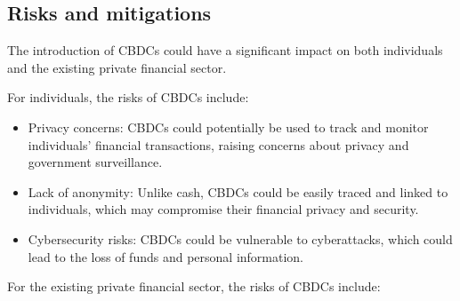 \subsection{Risks and mitigations}
The introduction of CBDCs could have a significant impact on both individuals and the existing private financial sector.\par
For individuals, the risks of CBDCs include:
\begin{itemize}
\item Privacy concerns: CBDCs could potentially be used to track and monitor individuals' financial transactions, raising concerns about privacy and government surveillance.
\item Lack of anonymity: Unlike cash, CBDCs could be easily traced and linked to individuals, which may compromise their financial privacy and security.
\item Cybersecurity risks: CBDCs could be vulnerable to cyberattacks, which could lead to the loss of funds and personal information.
\end{itemize}
For the existing private financial sector, the risks of CBDCs include:
